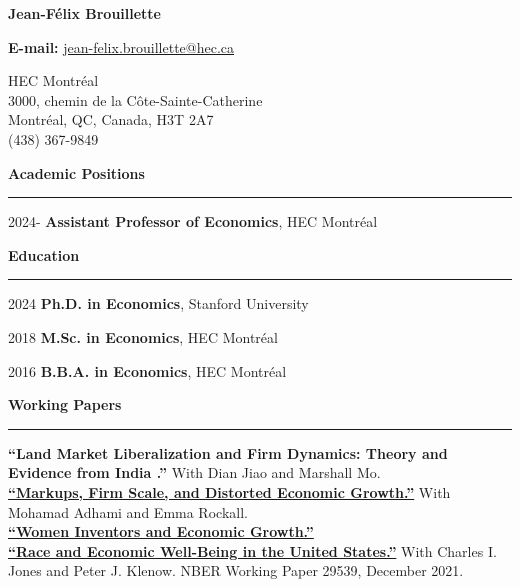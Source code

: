 \documentclass[12pt]{article}
\begin{document}
\begin{center}
{\huge \textbf{Jean-F\'elix Brouillette}} \\

\vspace{0.5cm}

\textbf{E-mail:} \href{mailto:jean-felix.brouillette@hec.ca}{jean-felix.brouillette@hec.ca} \\

\vspace{0.5cm}

\begin{small}
HEC Montr\'eal \\
3000, chemin de la C\^ote-Sainte-Catherine \\
Montr\'eal, QC, Canada, H3T 2A7 \\
(438) 367-9849
\end{small}
\end{center}

{\large \textbf{Academic Positions}} \\
\noindent\rule[0.5\baselineskip]{\textwidth}{1pt}

\begin{small}
2024- \tabto{1.5cm} \textbf{Assistant Professor of Economics}, HEC Montr\'eal
\end{small}

\vspace{0.5cm}

{\large \textbf{Education}} \\
\noindent\rule[0.5\baselineskip]{\textwidth}{1pt}

\begin{small}
2024 \tabto{1.5cm} \textbf{Ph.D. in Economics}, Stanford University

2018 \tabto{1.5cm} \textbf{M.Sc. in Economics}, HEC Montr\'eal

2016 \tabto{1.5cm} \textbf{B.B.A. in Economics}, HEC Montr\'eal
\end{small}

\vspace{0.5cm}

{\large \textbf{Working Papers}} \\
\noindent\rule[0.5\baselineskip]{\textwidth}{1pt}

\begin{small}
\textbf{``Land Market Liberalization and Firm Dynamics: Theory and Evidence from India
.''} With Dian Jiao and Marshall Mo. \\[-0.5\baselineskip]

\href{https://jfbrou.github.io/papers/markups.pdf}{\textbf{``Markups, Firm Scale, and Distorted Economic Growth.''}} With Mohamad Adhami and Emma Rockall. \\[-0.5\baselineskip]

\href{https://jfbrou.github.io/papers/hopper.pdf}{\textbf{``Women Inventors and Economic Growth.''}}\\[-0.5\baselineskip]

\href{http://klenow.com/BrouilletteJonesKlenow_Race_and_Welfare.pdf}{\textbf{``Race and Economic Well-Being in the United States.''}} With Charles I. Jones and Peter J. Klenow. NBER Working Paper 29539, December 2021.
\end{small}
\end{document}
